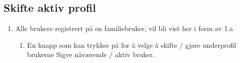 \subsection{Skifte aktiv profil}
\begin{center}
\end{center}
\begin{enumerate}[nosep]
    \item Alle brukere registrert på en familiebruker, vil bli vist her i form av 1.a
    \begin{enumerate}
        \item En knapp som kan trykkes på for å velge å skifte / gjøre underprofil brukerne Sigve nåværende / aktiv bruker. 
    \end{enumerate}
\end{enumerate}

